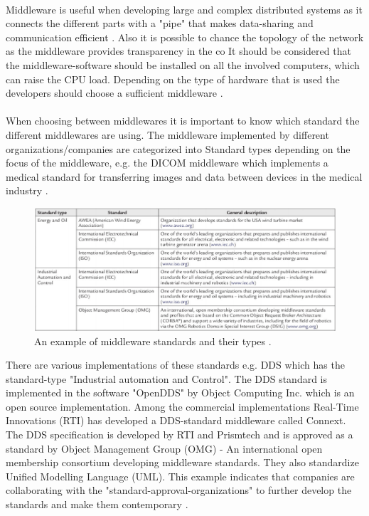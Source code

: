 \documentclass[Main]{subfiles}
\begin{document}
\\
Middleware is useful when developing large and complex distributed systems as it connects the different parts with a "pipe" that makes data-sharing and communication efficient \cite{DDS-slides} \cite[p. 68]{Coulouris}. Also it is possible to chance the topology of the network as the middleware provides transparency in the co It should be considered that the middleware-software should be installed on all the involved computers, which can raise the CPU load. Depending on the type of hardware that is used the developers should choose a sufficient middleware \cite{DDS-slides}.
\\
\\
When choosing between middlewares it is important to know which standard the different middlewares are using. The middleware implemented by different organizations/companies are categorized into Standard types depending on the focus of the middleware, e.g. the DICOM middleware which implements a medical standard for transferring images and data between devices in the medical industry \cite{DDS_slides}.\\

\begin{figure}[H]
\centering
\includegraphics[scale=0.6]{Figure/Standards.png}
\caption{An example of middleware standards and their types \cite{DDS-slides}.}
\end{figure}

There are various implementations of these standards e.g. DDS which has the standard-type "Industrial automation and Control". The DDS standard is implemented in the software "OpenDDS" by Object Computing Inc. which is an open source implementation. Among the commercial implementations Real-Time Innovations (RTI) has developed a DDS-standard middleware called Connext.\\The DDS specification is developed by RTI and Prismtech and is approved as a standard by Object Management Group (OMG) - An international open membership consortium developing middleware standards. They also standardize Unified Modelling Language (UML). This example indicates that companies are collaborating with the "standard-approval-organizations" to further develop the standards and make them contemporary \cite{DDS-slides}.\\
\end{document}
